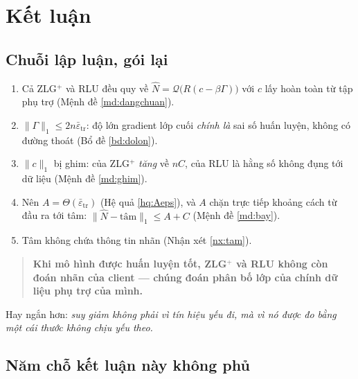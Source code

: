 \documentclass[11pt,a4paper]{article}
\theoremstyle{remark}
\newcommand{\quant}{\mathcal{Q}}
\newcommand{\epstr}{\bar\varepsilon_{\mathrm{tr}}}
\begin{document}
\section{Kết luận}
\label{sec:ket-luan}

\subsection{Chuỗi lập luận, gói lại}

\begin{enumerate}
\item Cả ZLG$^+$ và RLU đều quy về $\hat N=\quant\bigl(R(c-\beta\Gamma)\bigr)$
  với $c$ lấy hoàn toàn từ tập phụ trợ (Mệnh đề \ref{md:dangchuan}).
\item $\|\Gamma\|_1\le2n\epstr$: độ lớn gradient lớp cuối \emph{chính là} sai
  số huấn luyện, không có đường thoát (Bổ đề \ref{bd:dolon}).
\item $\|c\|_1$ bị ghim: của ZLG$^+$ \emph{tăng} về $nC$, của RLU là hằng số
  không đụng tới dữ liệu (Mệnh đề \ref{md:ghim}).
\item Nên $A=\Theta(\epstr)$ (Hệ quả \ref{hq:Aeps}), và $A$ chặn trực tiếp
  khoảng cách từ đầu ra tới tâm: $\|\hat N-\text{tâm}\|_1\le A+C$ (Mệnh đề
  \ref{md:bay}).
\item Tâm không chứa thông tin nhãn (Nhận xét \ref{nx:tam}).
\end{enumerate}

\begin{quote}
\textbf{Khi mô hình được huấn luyện tốt, ZLG$^+$ và RLU không còn đoán nhãn
của client --- chúng đoán phân bố lớp của chính dữ liệu phụ trợ của mình.}
\end{quote}

Hay ngắn hơn: \emph{suy giảm không phải vì tín hiệu yếu đi, mà vì nó được đo
bằng một cái thước không chịu yếu theo.}

\subsection{Năm chỗ kết luận này không phủ}
\end{document}
